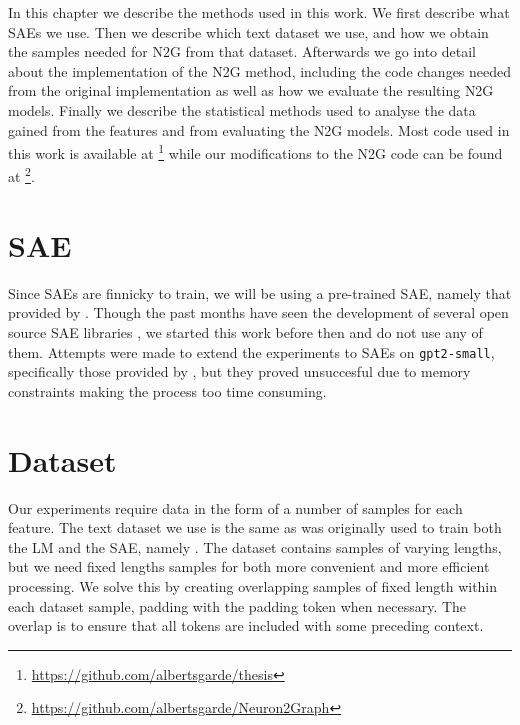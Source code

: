 In this chapter we describe the methods used in this work.
We first describe what \acp{SAE} we use.
Then we describe which text dataset we use, and how we obtain the samples needed for \ac{N2G} from that dataset.
Afterwards we go into detail about the implementation of the \ac{N2G} method, including the code changes needed from the original implementation as well as how we evaluate the resulting \ac{N2G} models.
Finally we describe the statistical methods used to analyse the data gained from the features and from evaluating the \ac{N2G} models.
Most code used in this work is available at \footnote{\url{https://github.com/albertsgarde/thesis}} while our modifications to the \ac{N2G} code can be found at \footnote{\url{https://github.com/albertsgarde/Neuron2Graph}}.

\section{SAE}
Since \acp{SAE} are finnicky to train, we will be using a pre-trained SAE, namely that provided by \textcite{nanda_neelnandasparse_autoencoder_nodate}.
Though the past months have seen the development of several open source \ac{SAE} libraries \parencite{bloom_jbloomaussaelens_2024}\parencite{cooney_ai-safety-foundationsparse_autoencoder_2024}, we started this work before then and do not use any of them.
Attempts were made to extend the experiments to \acp{SAE} on \texttt{gpt2-small}, specifically those provided by \textcite{wu_openaisparse_autoencoder_2024}, but they proved unsuccesful due to memory constraints making the process too time consuming.

\section{Dataset}
\label{sec:dataset}
Our experiments require data in the form of a number of samples for each feature.
The text dataset we use is the same as was originally used to train both the \ac{LM} and the SAE, namely \textcite{nanda_neelnandac4-code-20k_nodate}.
The dataset contains samples of varying lengths, but we need fixed lengths samples for both more convenient and more efficient processing.
We solve this by creating overlapping samples of fixed length within each dataset sample, padding with the padding token when necessary.
The overlap is to ensure that all tokens are included with some preceding context.

